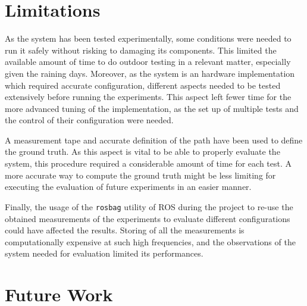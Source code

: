 \section{Limitations}
\noindent
As the system has been tested experimentally, some conditions were needed to run it safely without risking to damaging its components.
This limited the available amount of time to do outdoor testing in a relevant matter, especially given the raining days.
Moreover, as the system is an hardware implementation which required accurate configuration, different aspects needed to be tested extensively before running the experiments. 
This aspect left fewer time for the more advanced tuning of the implementation, as the set up of multiple tests and the control of their configuration were needed.

A measurement tape and accurate definition of the path have been used to define the ground truth.
As this aspect is vital to be able to properly evaluate the system, this procedure required a considerable amount of time for each test.
A more accurate way to compute the ground truth might be less limiting for executing the evaluation of future experiments in an easier manner.

Finally, the usage of the \texttt{rosbag} utility of \gls{ROS} during the project to re-use the obtained measurements of the experiments to evaluate different configurations could have affected the results.
Storing of all the measurements is computationally expensive at such high frequencies, and the observations of the system needed for evaluation limited its performances.


\section{Future Work}
\label{sec:futureWork}


